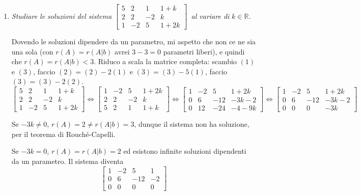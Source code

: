 \documentclass{article}
\begin{document}
\begin{enumerate}
\item \textit{Studiare le soluzioni del sistema }$\left[ 
\begin{array}{cccc}
5 & 2 & 1 & 1+k \\ 
2 & 2 & -2 & k \\ 
1 & -2 & 5 & 1+2k%
\end{array}%
\right] $\textit{\ al variare di }$k\in 
\mathbb{R}
$\textit{.}

Dovendo le soluzioni dipendere da un parametro, mi aspetto che non ce ne sia
una sola (con $r\left( A\right) =r\left( A|b\right) $ avrei $3-3=0$
parametri liberi), e quindi che $r\left( A\right) =r\left( A|b\right) <3$.
Riduco a scala la matrice completa: scambio $\left( 1\right) $ e $\left(
3\right) $, faccio $\left( 2\right) =\left( 2\right) -2\left( 1\right) $ e $%
\left( 3\right) =\left( 3\right) -5\left( 1\right) $, faccio $\left(
3\right) =\left( 3\right) -2\left( 2\right) $.%
\begin{equation*}
\left[ 
\begin{array}{cccc}
5 & 2 & 1 & 1+k \\ 
2 & 2 & -2 & k \\ 
1 & -2 & 5 & 1+2k%
\end{array}%
\right] \Longleftrightarrow \left[ 
\begin{array}{cccc}
1 & -2 & 5 & 1+2k \\ 
2 & 2 & -2 & k \\ 
5 & 2 & 1 & 1+k%
\end{array}%
\right] \Longleftrightarrow \left[ 
\begin{array}{cccc}
1 & -2 & 5 & 1+2k \\ 
0 & 6 & -12 & -3k-2 \\ 
0 & 12 & -24 & -4-9k%
\end{array}%
\right] \Longleftrightarrow \left[ 
\begin{array}{cccc}
1 & -2 & 5 & 1+2k \\ 
0 & 6 & -12 & -3k-2 \\ 
0 & 0 & 0 & -3k%
\end{array}%
\right]
\end{equation*}

Se $-3k\neq 0$, $r\left( A\right) =2\neq r\left( A|b\right) =3$, dunque il
sistema non ha soluzione, per il teorema di Rouch\'{e}-Capelli.

Se $-3k=0$, $r\left( A\right) =r\left( A|b\right) =2$ ed esistono infinite
soluzioni dipendenti da un parametro. Il sistema diventa%
\begin{equation*}
\left[ 
\begin{array}{cccc}
1 & -2 & 5 & 1 \\ 
0 & 6 & -12 & -2 \\ 
0 & 0 & 0 & 0%
\end{array}%
\right]
\end{equation*}


\end{enumerate}
\end{document}
